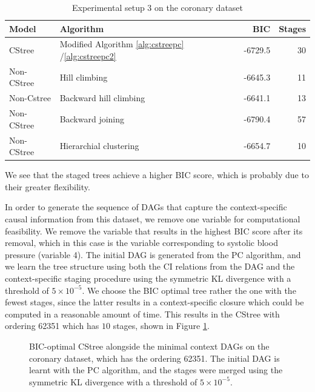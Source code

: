 \documentclass{tufte-book}
\begin{document}
\begin{table}[htbp]
\caption{\label{tab:org38c986e}Experimental setup 3 on the coronary dataset}
\centering
\begin{tabular}{l|l|r|r}
\hline
Model & Algorithm & BIC & Stages\\
\hline
CStree & Modified Algorithm \ref{alg:cstreepc} /\ref{alg:cstreepc2} & -6729.5 & 30\\
Non-CStree & Hill climbing & -6645.3 & 11\\
Non-Cstree & Backward hill climbing & -6641.1 & 13\\
Non-CStree & Backward joining & -6790.4 & 57\\
Non-CStree & Hierarchial clustering & -6654.7 & 10\\
\end{tabular}
\end{table}



We see that the staged trees achieve a higher BIC score, which is probably due to their greater flexibility.


In order to generate the sequence of DAGs that capture the context-specific causal information from this dataset, we remove one variable for computational feasibility. We remove the variable that results in the highest BIC score after its removal, which in this case is the variable corresponding to systolic blood pressure (variable 4). The initial DAG is generated from the PC algorithm, and we learn the tree structure using both the CI relations from the DAG and the context-specific staging procedure using the symmetric KL divergence with a threshold of \(5\times 10^{-5}\). We choose the BIC optimal tree rather the one with the fewest stages, since the latter results in a context-specific closure which could be computed in a reasonable amount of time.  This results in the CStree with ordering 62351 which has \(10\) stages, shown in Figure \ref{fig:coronary_wout4}. 


\begin{figure}[!h]\label{fig:coronary_wout4}
   \begin{floatrow}
%
\caption{BIC-optimal CStree alongside the minimal context DAGs on the coronary dataset, which has the ordering 62351. The initial DAG is learnt with the PC algorithm, and the stages were merged using the symmetric KL divergence with a threshold of $5\times 10^{-5}$. }
        
   \end{floatrow}
\end{figure}
\end{document}

